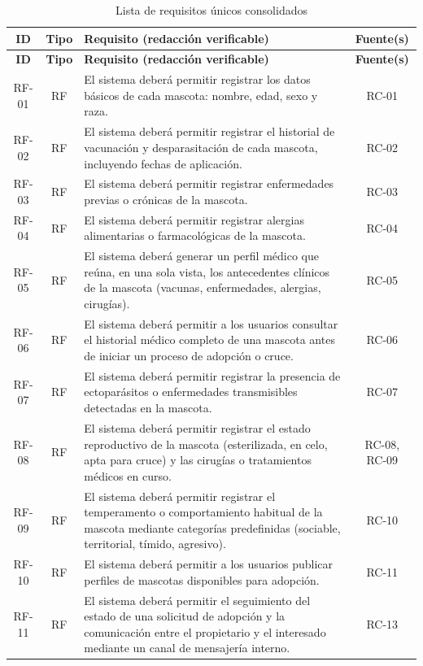\begin{longtable}{|c|c|p{9.5cm}|c|}
	\caption{Lista de requisitos únicos consolidados}
	\label{tab:requisitos_unicos} \\
	\hline
	\textbf{ID} & \textbf{Tipo} & \textbf{Requisito (redacción verificable)} & \textbf{Fuente(s)} \\ \hline
	\endfirsthead
	\hline
	\textbf{ID} & \textbf{Tipo} & \textbf{Requisito (redacción verificable)} & \textbf{Fuente(s)} \\ \hline
	\endhead
	RF-01 & RF & El sistema deberá permitir registrar los datos básicos de cada mascota: nombre, edad, sexo y raza. & RC-01 \\ \hline
	RF-02 & RF & El sistema deberá permitir registrar el historial de vacunación y desparasitación de cada mascota, incluyendo fechas de aplicación. & RC-02 \\ \hline
	RF-03 & RF & El sistema deberá permitir registrar enfermedades previas o crónicas de la mascota. & RC-03 \\ \hline
	RF-04 & RF & El sistema deberá permitir registrar alergias alimentarias o farmacológicas de la mascota. & RC-04 \\ \hline
	RF-05 & RF & El sistema deberá generar un perfil médico que reúna, en una sola vista, los antecedentes clínicos de la mascota (vacunas, enfermedades, alergias, cirugías). & RC-05 \\ \hline
	RF-06 & RF & El sistema deberá permitir a los usuarios consultar el historial médico completo de una mascota antes de iniciar un proceso de adopción o cruce. & RC-06 \\ \hline
	RF-07 & RF & El sistema deberá permitir registrar la presencia de ectoparásitos o enfermedades transmisibles detectadas en la mascota. & RC-07 \\ \hline
	RF-08 & RF & El sistema deberá permitir registrar el estado reproductivo de la mascota (esterilizada, en celo, apta para cruce) y las cirugías o tratamientos médicos en curso. & RC-08, RC-09 \\ \hline
	RF-09 & RF & El sistema deberá permitir registrar el temperamento o comportamiento habitual de la mascota mediante categorías predefinidas (sociable, territorial, tímido, agresivo). & RC-10 \\ \hline
	RF-10 & RF & El sistema deberá permitir a los usuarios publicar perfiles de mascotas disponibles para adopción. & RC-11 \\ \hline
	RF-11 & RF & El sistema deberá permitir el seguimiento del estado de una solicitud de adopción y la comunicación entre el propietario y el interesado mediante un canal de mensajería interno. & RC-13 \\ \hline

\end{longtable}
